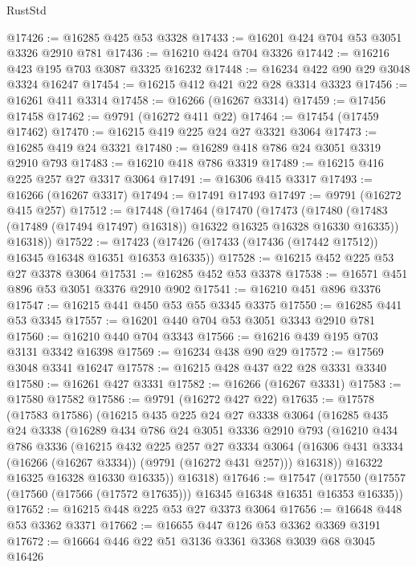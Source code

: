 \begin{lexlean}{RustStd}
\begin{coremodule}
@17426 := @16285 @425 @53 @3328
@17433 := @16201 @424 @704 @53 @3051 @3326 @2910 @781
@17436 := @16210 @424 @704 @3326
@17442 := @16216 @423 @195 @703 @3087 @3325 @16232
@17448 := @16234 @422 @90 @29 @3048 @3324 @16247
@17454 := @16215 @412 @421 @22 @28 @3314 @3323
@17456 := @16261 @411 @3314
@17458 := @16266 (@16267 @3314)
@17459 := @17456 @17458
@17462 := @9791 (@16272 @411 @22)
@17464 := @17454 (@17459 @17462)
@17470 := @16215 @419 @225 @24 @27 @3321 @3064
@17473 := @16285 @419 @24 @3321
@17480 := @16289 @418 @786 @24 @3051 @3319 @2910 @793
@17483 := @16210 @418 @786 @3319
@17489 := @16215 @416 @225 @257 @27 @3317 @3064
@17491 := @16306 @415 @3317
@17493 := @16266 (@16267 @3317)
@17494 := @17491 @17493
@17497 := @9791 (@16272 @415 @257)
@17512 := @17448
    (@17464
      (@17470
        (@17473
          (@17480 (@17483 (@17489 (@17494 @17497) @16318)) @16322 @16325 @16328 @16330 @16335))
        @16318))
@17522 := @17423 (@17426 (@17433 (@17436 (@17442 @17512)) @16345 @16348 @16351 @16353 @16335))
@17528 := @16215 @452 @225 @53 @27 @3378 @3064
@17531 := @16285 @452 @53 @3378
@17538 := @16571 @451 @896 @53 @3051 @3376 @2910 @902
@17541 := @16210 @451 @896 @3376
@17547 := @16215 @441 @450 @53 @55 @3345 @3375
@17550 := @16285 @441 @53 @3345
@17557 := @16201 @440 @704 @53 @3051 @3343 @2910 @781
@17560 := @16210 @440 @704 @3343
@17566 := @16216 @439 @195 @703 @3131 @3342 @16398
@17569 := @16234 @438 @90 @29
@17572 := @17569 @3048 @3341 @16247
@17578 := @16215 @428 @437 @22 @28 @3331 @3340
@17580 := @16261 @427 @3331
@17582 := @16266 (@16267 @3331)
@17583 := @17580 @17582
@17586 := @9791 (@16272 @427 @22)
@17635 := @17578
    (@17583 @17586)
    (@16215
      @435
      @225
      @24
      @27
      @3338
      @3064
      (@16285
        @435
        @24
        @3338
        (@16289
          @434
          @786
          @24
          @3051
          @3336
          @2910
          @793
          (@16210
            @434
            @786
            @3336
            (@16215
              @432
              @225
              @257
              @27
              @3334
              @3064
              (@16306 @431 @3334 (@16266 (@16267 @3334)) (@9791 (@16272 @431 @257)))
              @16318))
          @16322
          @16325
          @16328
          @16330
          @16335))
      @16318)
@17646 := @17547
    (@17550 (@17557 (@17560 (@17566 (@17572 @17635))) @16345 @16348 @16351 @16353 @16335))
@17652 := @16215 @448 @225 @53 @27 @3373 @3064
@17656 := @16648 @448 @53 @3362 @3371
@17662 := @16655 @447 @126 @53 @3362 @3369 @3191
@17672 := @16664 @446 @22 @51 @3136 @3361 @3368 @3039 @68 @3045 @16426

\end{coremodule}
\end{lexlean}
